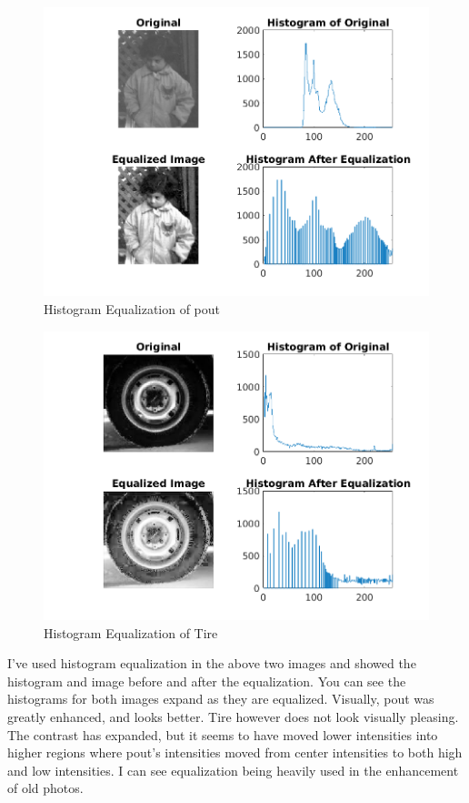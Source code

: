 \begin{figure}[H]
    \centering
    \includegraphics[scale=0.75]{pout_gray_equalize.png}
    \caption{Histogram Equalization of pout}
\end{figure}

\begin{figure}[H]
    \centering
    \includegraphics[scale=0.75]{Tire_gray_equalize.png}
    \caption{Histogram Equalization of Tire}
\end{figure}

I've used histogram equalization in the above two images and showed the
histogram and image before and after the equalization. You can see the
histograms for both images expand as they are equalized. Visually, pout was
greatly enhanced, and looks better. Tire however does not look visually
pleasing. The contrast has expanded, but it seems to have moved lower
intensities into higher regions where pout's intensities moved from center
intensities to both high and low intensities. I can see equalization being
heavily used in the enhancement of old photos.

